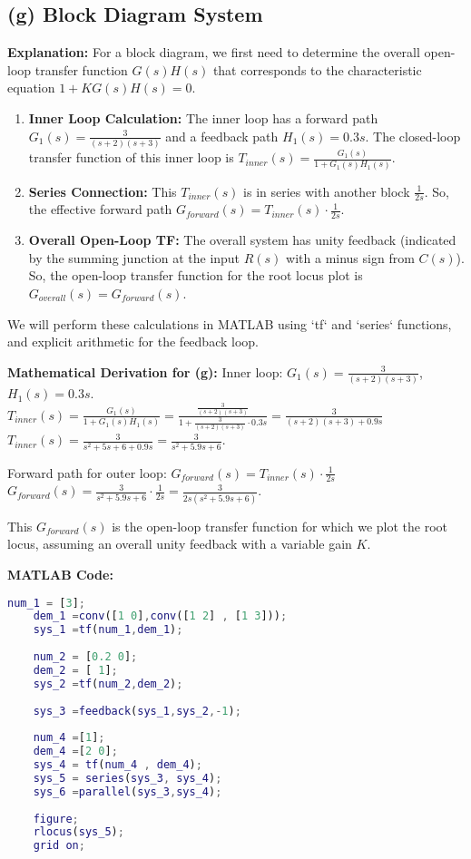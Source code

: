 \documentclass[a4paper,12pt]{article}
\begin{document}
	\subsection*{(g) Block Diagram System}
	
	\textbf{Explanation:}
	For a block diagram, we first need to determine the overall open-loop transfer function $G(s)H(s)$ that corresponds to the characteristic equation $1 + K G(s)H(s) = 0$.
	\begin{enumerate}
		\item \textbf{Inner Loop Calculation:} The inner loop has a forward path $G_1(s) = \frac{3}{(s+2)(s+3)}$ and a feedback path $H_1(s) = 0.3s$. The closed-loop transfer function of this inner loop is $T_{inner}(s) = \frac{G_1(s)}{1+G_1(s)H_1(s)}$.
		\item \textbf{Series Connection:} This $T_{inner}(s)$ is in series with another block $\frac{1}{2s}$. So, the effective forward path $G_{forward}(s) = T_{inner}(s) \cdot \frac{1}{2s}$.
		\item \textbf{Overall Open-Loop TF:} The overall system has unity feedback (indicated by the summing junction at the input $R(s)$ with a minus sign from $C(s)$). So, the open-loop transfer function for the root locus plot is $G_{overall}(s) = G_{forward}(s)$.
	\end{enumerate}
	We will perform these calculations in MATLAB using `tf` and `series` functions, and explicit arithmetic for the feedback loop.
	
	\textbf{Mathematical Derivation for (g):}
	Inner loop: $G_1(s) = \frac{3}{(s+2)(s+3)}$, $H_1(s) = 0.3s$.
	$T_{inner}(s) = \frac{G_1(s)}{1+G_1(s)H_1(s)} = \frac{\frac{3}{(s+2)(s+3)}}{1+\frac{3}{(s+2)(s+3)} \cdot 0.3s} = \frac{3}{(s+2)(s+3) + 0.9s}$
	$T_{inner}(s) = \frac{3}{s^2+5s+6+0.9s} = \frac{3}{s^2+5.9s+6}$.
	
	Forward path for outer loop: $G_{forward}(s) = T_{inner}(s) \cdot \frac{1}{2s}$
	$G_{forward}(s) = \frac{3}{s^2+5.9s+6} \cdot \frac{1}{2s} = \frac{3}{2s(s^2+5.9s+6)}$.
	
	This $G_{forward}(s)$ is the open-loop transfer function for which we plot the root locus, assuming an overall unity feedback with a variable gain $K$.
	
	\textbf{MATLAB Code:}
	\begin{lstlisting}[language=Matlab, caption=MATLAB Code for System (g)]
	num_1 = [3];
	dem_1 =conv([1 0],conv([1 2] , [1 3]));
	sys_1 =tf(num_1,dem_1);
	
	num_2 = [0.2 0];
	dem_2 = [ 1];
	sys_2 =tf(num_2,dem_2);
	
	sys_3 =feedback(sys_1,sys_2,-1);
	
	num_4 =[1];
	dem_4 =[2 0];
	sys_4 = tf(num_4 , dem_4);
	sys_5 = series(sys_3, sys_4);
	sys_6 =parallel(sys_3,sys_4);
	
	figure;
	rlocus(sys_5);
	grid on;
	\end{lstlisting}
	
\end{document}
